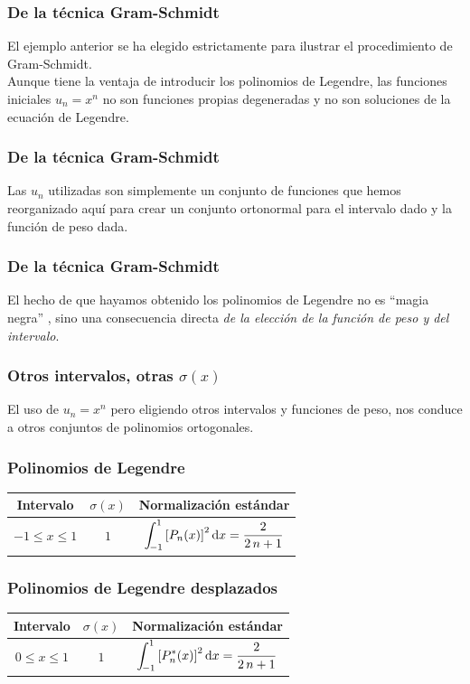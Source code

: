 \documentclass[12pt]{beamer}
\begin{document}
\begin{frame}
\frametitle{De la técnica Gram-Schmidt}
El ejemplo anterior se ha elegido estrictamente para ilustrar el procedimiento de Gram-Schmidt.
\\
\bigskip
\pause
Aunque tiene la ventaja de introducir los polinomios de Legendre, las funciones iniciales $u_{n} = x^{n}$ no son funciones propias degeneradas y no son soluciones de la ecuación de Legendre.
\end{frame}
\begin{frame}
\frametitle{De la técnica Gram-Schmidt}  
Las $u_{n}$ utilizadas son simplemente un conjunto de funciones que hemos reorganizado aquí para crear un conjunto ortonormal para el intervalo dado y la función de peso dada.
\end{frame}
\begin{frame}
\frametitle{De la técnica Gram-Schmidt}  
El hecho de que hayamos obtenido los polinomios de Legendre no es \enquote{magia negra} , sino una consecuencia directa \emph{de la elección de la función de peso y del intervalo}.
\end{frame}
\begin{frame}
\frametitle{Otros intervalos, otras $\sigma (x)$}  
El uso de $u_{n} = x^{n}$ pero eligiendo otros intervalos y funciones de peso, nos conduce a otros conjuntos de polinomios ortogonales. 
\end{frame}
\begin{frame}
\frametitle{Polinomios de Legendre}
\begin{table}
  \begin{tabular}{c c c}
  Intervalo & $\sigma (x)$ & Normalización estándar \\ \hline
  $-1 \leq x \leq 1$ & $1$ & $\displaystyle \scaleint{5ex}_{\bs -1}^{1} \left[ P_{n} (x) \right]^{2} \dd{x} = \dfrac{2}{2 \, n + 1} $
  \end{tabular}
\end{table}
\end{frame}
\begin{frame}
\frametitle{Polinomios de Legendre desplazados}
\begin{table}
  \begin{tabular}{c c c}
  Intervalo & $\sigma (x)$ & Normalización estándar \\ \hline
  $0 \leq x \leq 1$ & $1$ & $\displaystyle \scaleint{5ex}_{\bs -1}^{1} \left[ P_{n}^{*}(x) \right]^{2} \dd{x} = \dfrac{2}{2 \, n + 1}$  
\end{tabular}
\end{table}
\end{frame}
\end{document}

